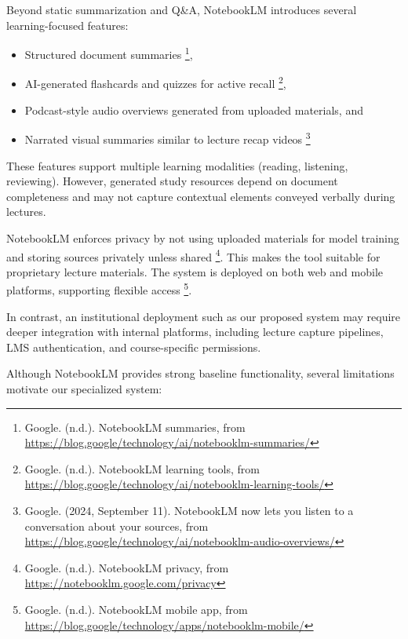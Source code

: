 Beyond static summarization and Q\&A, NotebookLM introduces several learning-focused features:

\begin{itemize}
    \item Structured document summaries \footnote{Google. (n.d.). NotebookLM summaries, from \url{https://blog.google/technology/ai/notebooklm-summaries/}},
    \item AI-generated flashcards and quizzes for active recall \footnote{Google. (n.d.). NotebookLM learning tools, from \url{https://blog.google/technology/ai/notebooklm-learning-tools/}},
    \item Podcast-style audio overviews generated from uploaded materials, and
    \item Narrated visual summaries similar to lecture recap videos \footnote{Google. (2024, September 11). NotebookLM now lets you listen to a conversation about your sources, from \url{https://blog.google/technology/ai/notebooklm-audio-overviews/}}
\end{itemize}

These features support multiple learning modalities (reading, listening, reviewing). However, generated study resources depend on document completeness and may not capture contextual elements conveyed verbally during lectures.


NotebookLM enforces privacy by not using uploaded materials for model training and storing sources privately unless shared \footnote{Google. (n.d.). NotebookLM privacy, from \url{https://notebooklm.google.com/privacy}}. This makes the tool suitable for proprietary lecture materials. The system is deployed on both web and mobile platforms, supporting flexible access \footnote{Google. (n.d.). NotebookLM mobile app, from \url{https://blog.google/technology/apps/notebooklm-mobile/}}.

In contrast, an institutional deployment such as our proposed system may require deeper integration with internal platforms, including lecture capture pipelines, LMS authentication, and course-specific permissions.


Although NotebookLM provides strong baseline functionality, several limitations motivate our specialized system:

